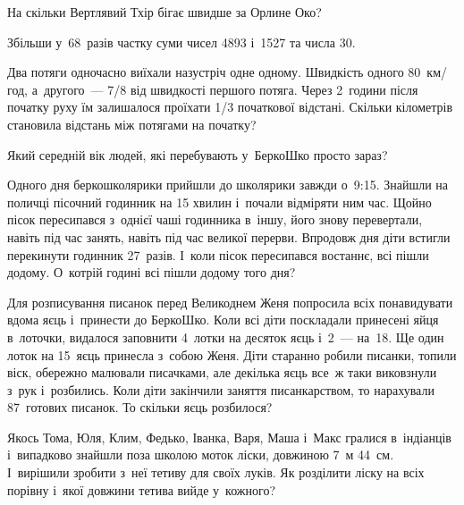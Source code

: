 На скільки Вертлявий Тхір бігає швидше за Орлине Око?


\problem
Збільши у~68~разів частку суми чисел 4893 і~1527 та числа 30.


\problem
Два потяги одночасно виїхали назустріч одне одному.
Швидкість одного 80~км/год, а~другого~--- 7/8 від швидкості першого потяга.
Через 2~години після початку руху їм залишалося проїхати
1/3 початкової відстані.
Скільки кілометрів становила відстань між потягами на початку?


\problem
Який середній вік людей, які перебувають у~БеркоШко просто зараз?


\problem
Одного дня беркошколярики прийшли до школярики завжди о~9:15.
Знайшли на поличці пісочний годинник на 15 хвилин і~почали відміряти ним час.
Щойно пісок пересипався з~однієї чаші годинника в~іншу,
його знову перевертали, навіть під час занять,
навіть під час великої перерви.
Впродовж дня діти встигли перекинути годинник 27~разів.
І~коли пісок пересипався востаннє, всі пішли додому.
О~котрій годині всі пішли додому того дня?


\problem
Для розписування писанок перед Великоднем Женя попросила всіх понавидувати
вдома яєць і~принести до БеркоШко. Коли всі діти поскладали принесені яйця
в~лоточки, видалося заповнити 4~лотки на десяток яєць і~2~--- на~18.
Ще один лоток на 15~яєць принесла з~собою Женя.
Діти старанно робили писанки, топили віск, обережно малювали писачками,
але декілька яєць все~ж таки виковзнули з~рук і~розбились.
Коли діти закінчили заняття писанкарством, то нарахували 87~готових писанок.
То скільки яєць розбилося?


\problem
Якось Тома, Юля, Клим, Федько, Іванка, Варя, Маша і~Макс гралися
в~індіанців і~випадково знайшли поза школою моток ліски, довжиною 7~м 44~см.
І~вирішили зробити з~неї тетиву для своїх луків.
Як розділити ліску на всіх порівну і~якої довжини тетива вийде у~кожного?
